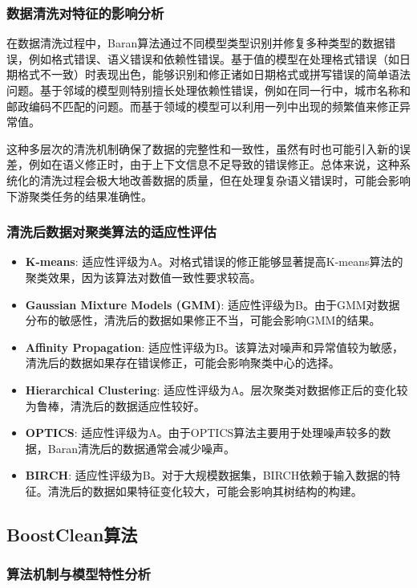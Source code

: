 \documentclass{ctexart} %
\begin{document}
\subsubsection{数据清洗对特征的影响分析}

在数据清洗过程中，Baran算法通过不同模型类型识别并修复多种类型的数据错误，例如格式错误、语义错误和依赖性错误。基于值的模型在处理格式错误（如日期格式不一致）时表现出色，能够识别和修正诸如日期格式或拼写错误的简单语法问题。基于邻域的模型则特别擅长处理依赖性错误，例如在同一行中，城市名称和邮政编码不匹配的问题。而基于领域的模型可以利用一列中出现的频繁值来修正异常值。

这种多层次的清洗机制确保了数据的完整性和一致性，虽然有时也可能引入新的误差，例如在语义修正时，由于上下文信息不足导致的错误修正。总体来说，这种系统化的清洗过程会极大地改善数据的质量，但在处理复杂语义错误时，可能会影响下游聚类任务的结果准确性。

\subsubsection{清洗后数据对聚类算法的适应性评估}
\begin{itemize}
    \item \textbf{K-means}: 适应性评级为A。对格式错误的修正能够显著提高K-means算法的聚类效果，因为该算法对数值一致性要求较高。
    \item \textbf{Gaussian Mixture Models (GMM)}: 适应性评级为B。由于GMM对数据分布的敏感性，清洗后的数据如果修正不当，可能会影响GMM的结果。
    \item \textbf{Affinity Propagation}: 适应性评级为B。该算法对噪声和异常值较为敏感，清洗后的数据如果存在错误修正，可能会影响聚类中心的选择。
    \item \textbf{Hierarchical Clustering}: 适应性评级为A。层次聚类对数据修正后的变化较为鲁棒，清洗后的数据适应性较好。
    \item \textbf{OPTICS}: 适应性评级为A。由于OPTICS算法主要用于处理噪声较多的数据，Baran清洗后的数据通常会减少噪声。
    \item \textbf{BIRCH}: 适应性评级为B。对于大规模数据集，BIRCH依赖于输入数据的特征。清洗后的数据如果特征变化较大，可能会影响其树结构的构建。
\end{itemize}

\subsection{BoostClean算法}

\subsubsection{算法机制与模型特性分析}
\end{document}
